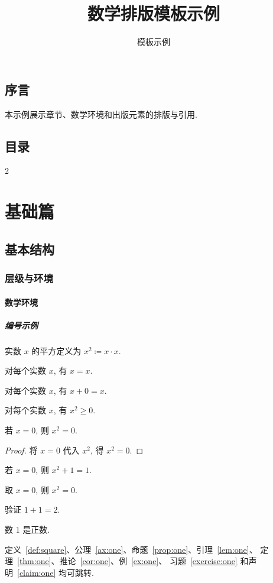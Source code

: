 \documentclass[UTF8,12pt,oneside,fontset=fandol]{ctexbook}
\makeatletter
\renewcommand{\tableofcontents}{%
    \chapter*{目录}%
    \begin{multicols}{2}\@starttoc{toc}\end{multicols}}
\makeatother
\begin{document}
\title{数学排版模板示例}
\author{模板示例}
\date{}
\maketitle
\frontmatter
\chapter*{序言}
本示例展示章节、数学环境和出版元素的排版与引用.
\newpage
\tableofcontents
\newpage
\mainmatter
\part{基础篇}

\chapter{基本结构}\label{ch:structure}
\section{层级与环境}\label{sec:env}
\subsection{数学环境}
\subsubsection{编号示例}
\begin{definition}[平方]\label{def:square}
    实数 $x$ 的平方定义为 $x^2 \coloneqq x \cdot x$.
\end{definition}
\begin{axiom}\label{ax:one}
    对每个实数 $x$, 有 $x = x$.
\end{axiom}
\begin{proposition}\label{prop:one}
    对每个实数 $x$, 有 $x + 0 = x$.
\end{proposition}
\begin{lemma}\label{lem:one}
    对每个实数 $x$, 有 $x^2 \geq 0$.
\end{lemma}
\begin{theorem}[零元的平方]\label{thm:one}
    若 $x = 0$, 则 $x^2 = 0$.
\end{theorem}
\begin{proof}
    将 $x = 0$ 代入 $x^2$, 得 $x^2 = 0$.
\end{proof}
\begin{corollary}\label{cor:one}
    若 $x = 0$, 则 $x^2 + 1 = 1$.
\end{corollary}
\begin{example}[零元]\label{ex:one}
    取 $x = 0$, 则 $x^2 = 0$.
\end{example}
\begin{exercise}[加法]\label{exercise:one}
    验证 $1 + 1 = 2$.
\end{exercise}
\begin{claim}\label{claim:one}
    数 $1$ 是正数.
\end{claim}
定义~\ref{def:square}、公理~\ref{ax:one}、命题~\ref{prop:one}、引理~\ref{lem:one}、
定理~\ref{thm:one}、推论~\ref{cor:one}、例~\ref{ex:one}、
习题~\ref{exercise:one} 和声明~\ref{claim:one} 均可跳转.
\end{document}
